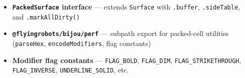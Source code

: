 \begin{itemize}
\tightlist
\item
  \textbf{\texttt{P\allowbreak{}a\allowbreak{}c\allowbreak{}k\allowbreak{}e\allowbreak{}d\allowbreak{}S\allowbreak{}u\allowbreak{}r\allowbreak{}f\allowbreak{}a\allowbreak{}c\allowbreak{}e} interface} --- extends \texttt{S\allowbreak{}u\allowbreak{}r\allowbreak{}f\allowbreak{}a\allowbreak{}c\allowbreak{}e} with \texttt{.\allowbreak{}b\allowbreak{}u\allowbreak{}f\allowbreak{}f\allowbreak{}e\allowbreak{}r}, \texttt{.\allowbreak{}s\allowbreak{}i\allowbreak{}d\allowbreak{}e\allowbreak{}T\allowbreak{}a\allowbreak{}b\allowbreak{}l\allowbreak{}e}, and \texttt{.\allowbreak{}m\allowbreak{}a\allowbreak{}r\allowbreak{}k\allowbreak{}A\allowbreak{}l\allowbreak{}l\allowbreak{}D\allowbreak{}i\allowbreak{}r\allowbreak{}t\allowbreak{}y\allowbreak{}(\allowbreak{})}
\item
  \textbf{\texttt{@\allowbreak{}f\allowbreak{}l\allowbreak{}y\allowbreak{}i\allowbreak{}n\allowbreak{}g\allowbreak{}r\allowbreak{}o\allowbreak{}b\allowbreak{}o\allowbreak{}t\allowbreak{}s\allowbreak{}/\allowbreak{}b\allowbreak{}i\allowbreak{}j\allowbreak{}o\allowbreak{}u\allowbreak{}/\allowbreak{}p\allowbreak{}e\allowbreak{}r\allowbreak{}f}} --- subpath export for packed-cell utilities (\texttt{p\allowbreak{}a\allowbreak{}r\allowbreak{}s\allowbreak{}e\allowbreak{}H\allowbreak{}e\allowbreak{}x}, \texttt{e\allowbreak{}n\allowbreak{}c\allowbreak{}o\allowbreak{}d\allowbreak{}e\allowbreak{}M\allowbreak{}o\allowbreak{}d\allowbreak{}i\allowbreak{}f\allowbreak{}i\allowbreak{}e\allowbreak{}r\allowbreak{}s}, flag constants)
\item
  \textbf{Modifier flag constants} --- \texttt{F\allowbreak{}L\allowbreak{}A\allowbreak{}G\allowbreak{}\_\allowbreak{}B\allowbreak{}O\allowbreak{}L\allowbreak{}D}, \texttt{F\allowbreak{}L\allowbreak{}A\allowbreak{}G\allowbreak{}\_\allowbreak{}D\allowbreak{}I\allowbreak{}M}, \texttt{F\allowbreak{}L\allowbreak{}A\allowbreak{}G\allowbreak{}\_\allowbreak{}S\allowbreak{}T\allowbreak{}R\allowbreak{}I\allowbreak{}K\allowbreak{}E\allowbreak{}T\allowbreak{}H\allowbreak{}R\allowbreak{}O\allowbreak{}U\allowbreak{}G\allowbreak{}H}, \texttt{F\allowbreak{}L\allowbreak{}A\allowbreak{}G\allowbreak{}\_\allowbreak{}I\allowbreak{}N\allowbreak{}V\allowbreak{}E\allowbreak{}R\allowbreak{}S\allowbreak{}E}, \texttt{U\allowbreak{}N\allowbreak{}D\allowbreak{}E\allowbreak{}R\allowbreak{}L\allowbreak{}I\allowbreak{}N\allowbreak{}E\allowbreak{}\_\allowbreak{}S\allowbreak{}O\allowbreak{}L\allowbreak{}I\allowbreak{}D}, etc.
\end{itemize}

